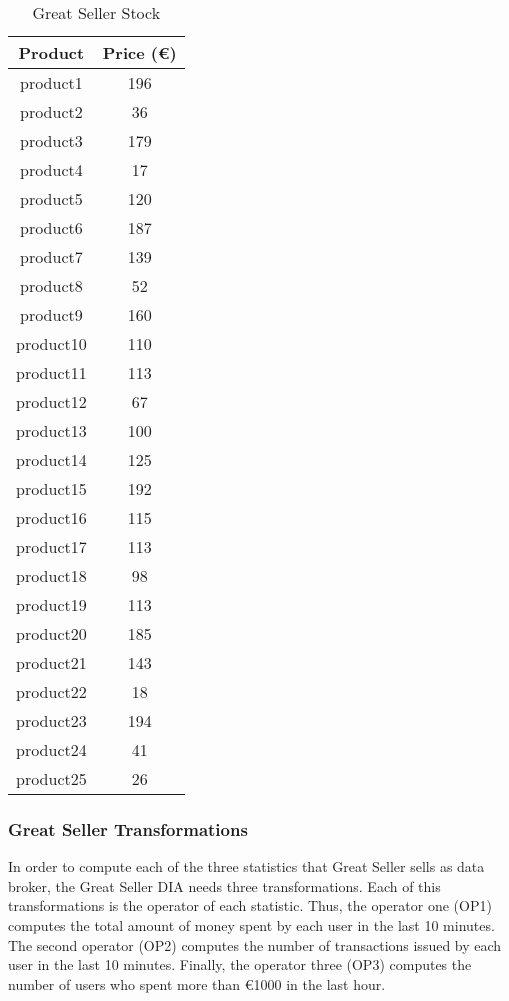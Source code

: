 \begin{table}[h!]
\centering
	\begin{tabular}{||c|c||} 
	\hline\hline
	Product & Price (\euro{}) \\ [1ex] 
	\hline\hline
	product1 & 196 \\ 
	\hline
	product2 & 36 \\ 
	\hline
	product3 & 179 \\ 
	\hline
	product4 & 17 \\ 
	\hline
	product5 & 120 \\ 
	\hline
	product6 & 187 \\ 
	\hline
	product7 & 139 \\ 
	\hline
	product8 & 52 \\ 
	\hline
	product9 & 160 \\ 
	\hline
	product10 & 110 \\ 
	\hline
	product11 & 113 \\ 
	\hline
	product12 & 67 \\ 
	\hline
	product13 & 100 \\ 
	\hline
	product14 & 125 \\ 
	\hline
	product15 & 192 \\ 
	\hline
	product16 & 115 \\ 
	\hline
	product17 & 113 \\ 
	\hline
	product18 & 98 \\ 
	\hline
	product19 & 113 \\ 
	\hline
	product20 & 185 \\ 
	\hline
	product21 & 143 \\ 
	\hline
	product22 & 18 \\ 
	\hline
	product23 & 194 \\ 
	\hline
	product24 & 41 \\ 
	\hline
	product25 & 26 \\ 
	\hline\hline
	\end{tabular}
\caption{Great Seller Stock}
\label{Great Seller Stock}
\end{table}

\subsubsection{Great Seller Transformations}
In order to compute each of the three statistics that Great Seller sells as data broker, the Great Seller DIA needs three transformations. Each of this transformations is the operator of each statistic. Thus, the operator one (OP1) computes the total amount of money spent by each user in the last 10 minutes. The second operator (OP2) computes the number of transactions issued by each user in the last 10 minutes. Finally, the operator three (OP3) computes the number of users who spent more than \euro{1000} in the last hour.

